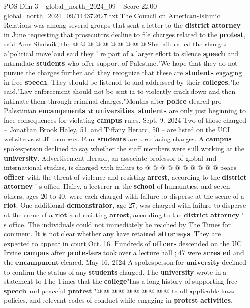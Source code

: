 \begin{textsample}{POS Dim 3 – global\_north\_2024\_09 – Score 22.00 – global\_north\_2024\_09/114372627.txt}
The Council on American-Islamic Relations was among several groups that sent a letter to the \textbf{district} \textbf{attorney} in June requesting that prosecutors decline to file charges related to the \textbf{protest}, said Amr Shabaik, the @ @ @ @ @ @ @ @ @ @ Shabaik called the charges a"political move"and said they ' re part of a larger effort to silence \textbf{speech} and intimidate \textbf{students} who offer support of Palestine."We hope that they do not pursue the charges further and they recognize that these are \textbf{students} engaging in free \textbf{speech}.
They should be listened to and addressed by their \textbf{colleges},"he said."Law enforcement should not be sent in to violently crack down and then intimate them through criminal charges."Months after \textbf{police} cleared pro-Palestinian \textbf{encampments} at \textbf{universities}, \textbf{students} are only just beginning to face consequences for violating \textbf{campus} rules.
Sept. 9, 2024 Two of those charged -- Jonathan Brook Haley, 51, and Tiffany Herard, 50 -- are listed on the UCI website as staff members.
Four \textbf{students} are also facing charges.
A \textbf{campus} spokesperson declined to say whether the staff members were still working at the \textbf{university}.
Advertisement Herard, an associate professor of global and international studies, is charged with failure to @ @ @ @ @ @ @ @ @ @ peace \textbf{officer} with the threat of violence and resisting \textbf{arrest}, according to the \textbf{district} \textbf{attorney} ' s office.
Haley, a lecturer in the \textbf{school} of humanities, and seven others, ages 20 to 40, were each charged with failure to disperse at the scene of a \textbf{riot}.
One additional \textbf{demonstrator}, age 27, was charged with failure to disperse at the scene of a \textbf{riot} and resisting \textbf{arrest}, according to the \textbf{district} \textbf{attorney} ' s office.
The individuals could not immediately be reached by The Times for comment.
It is not clear whether any have retained \textbf{attorneys}.
They are expected to appear in court Oct. 16.
Hundreds of \textbf{officers} descended on the UC Irvine \textbf{campus} after \textbf{protesters} took over a lecture hall ; 47 were \textbf{arrested} and the \textbf{encampment} cleared.
May 16, 2024 A spokesperson for \textbf{university} declined to confirm the status of any \textbf{students} charged.
The \textbf{university} wrote in a statement to The Times that the \textbf{college}"has a long history of supporting free \textbf{speech} and peaceful \textbf{protest}."@ @ @ @ @ @ @ @ @ @ to all applicable laws, policies, and relevant codes of conduct while engaging in \textbf{protest} \textbf{activities}.

\end{textsample}
